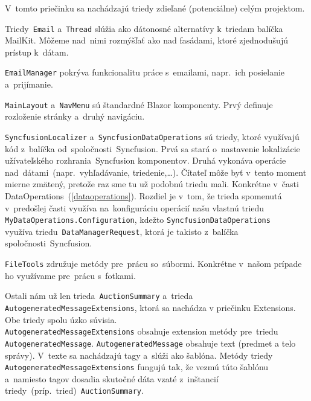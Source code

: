 V~tomto priečinku sa nachádzajú triedy zdieľané (potenciálne) celým projektom.

Triedy~\verb|Email| a~\verb|Thread| slúžia ako dátonosné alternatívy k~triedam balíčka MailKit. Môžeme nad~nimi rozmýšľať ako nad fasádami, ktoré zjednodušujú prístup k~dátam.

\verb|EmailManager| pokrýva funkcionalitu práce s~emailami, napr.~ich posielanie a~prijímanie.

\verb|MainLayout| a~\verb|NavMenu| sú štandardné Blazor komponenty. Prvý definuje rozloženie stránky a~druhý navigáciu.

\verb|SyncfusionLocalizer| a~\verb|SyncfusionDataOperations| sú triedy, ktoré využívajú kód z~balíčka od~spoločnosti~Syncfusion. Prvá sa stará o~nastavenie lokalizácie užívateľského rozhrania~Syncfusion komponentov. Druhá vykonáva operácie nad~dátami~(napr.~vyhľadávanie, triedenie,\dots). Čítateľ môže byť v~tento moment mierne zmätený, pretože raz sme tu už podobnú triedu mali. Konkrétne v~časti DataOperations~(\ref{dataoperations}). Rozdiel je v~tom, že trieda spomenutá v~predošlej časti využíva na~konfiguráciu operácií našu vlastnú triedu\\\verb|MyDataOperations.Configuration|, kdežto \verb|SyncfusionDataOperations|\\využíva triedu~\verb|DataManagerRequest|, ktorá je takisto z~balíčka spoločnosti~Syncfusion.

\verb|FileTools| združuje metódy pre~prácu so~súbormi. Konkrétne v~našom prípade ho využívame pre~prácu s~fotkami.

Ostali nám už len trieda~\verb|AuctionSummary| a~trieda\\\verb|AutogeneratedMessageExtensions|, ktorá sa nachádza v priečinku Extensions. Obe triedy spolu úzko súvisia.\\\verb|AutogeneratedMessageExtensions| obsahuje extension metódy pre~triedu\\\verb|AutogeneratedMessage|. \verb|AutogeneratedMessage| obsahuje text (predmet a telo správy). V~texte sa nachádzajú tagy a~slúži ako šablóna. Metódy triedy\\\verb|AutogeneratedMessageExtensions| fungujú tak, že vezmú túto šablónu a~namiesto tagov dosadia skutočné dáta vzaté z~inštancií\\triedy~(príp.~tried)~\verb|AuctionSummary|.
